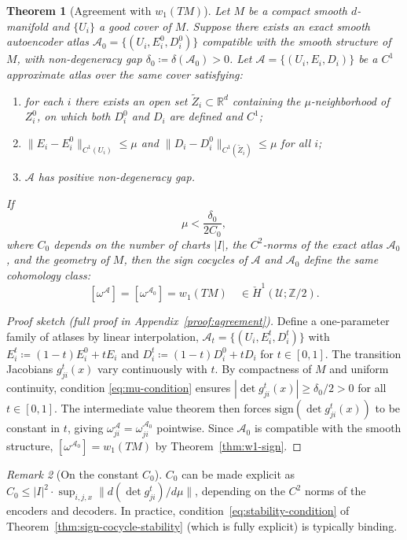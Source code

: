 \documentclass[11pt]{article}
\newcommand{\R}{\mathbb{R}}
\newcommand{\Z}{\mathbb{Z}}
\newcommand{\sign}{\mathrm{sign}}
\theoremstyle{plain}
\newtheorem{theorem}{Theorem}[section]
\theoremstyle{definition}
\theoremstyle{remark}
\newtheorem{remark}[theorem]{Remark}
\begin{document}
\begin{theorem}[Agreement with $w_1(TM)$]\label{thm:w1-agreement}
Let $M$ be a compact smooth $d$-manifold and $\{U_i\}$ a good cover of $M$. Suppose there exists an exact smooth autoencoder atlas $\mathcal{A}_0 = \{(U_i, E_i^0, D_i^0)\}$ compatible with the smooth structure of $M$, with non-degeneracy gap $\delta_0 \coloneqq \delta(\mathcal{A}_0) > 0$. Let $\mathcal{A} = \{(U_i, E_i, D_i)\}$ be a $C^1$ approximate atlas over the same cover satisfying:
\begin{enumerate}[label=(\roman*)]
    \item for each $i$ there exists an open set $\widetilde{Z}_i \subset \R^d$ containing the $\mu$-neighborhood of $Z_i^0$, on which both $D_i^0$ and $D_i$ are defined and $C^1$;
    \item $\|E_i - E_i^0\|_{C^1(U_i)} \leq \mu$ and $\|D_i - D_i^0\|_{C^1(\widetilde{Z}_i)} \leq \mu$ for all $i$;
    \item $\mathcal{A}$ has positive non-degeneracy gap.
\end{enumerate}
If
\begin{equation}\label{eq:mu-condition}
\mu < \frac{\delta_0}{2C_0},
\end{equation}
where $C_0$ depends on the number of charts $|I|$, the $C^2$-norms of the exact atlas $\mathcal{A}_0$, and the geometry of $M$, then the sign cocycles of $\mathcal{A}$ and $\mathcal{A}_0$ define the same cohomology class:
\[
[\omega^{\mathcal{A}}] = [\omega^{\mathcal{A}_0}] = w_1(TM) \quad \in \check{H}^1(\mathcal{U}; \Z/2).
\]
\end{theorem}
\begin{proof}[Proof sketch (full proof in Appendix~\ref{proof:agreement})]
Define a one-parameter family of atlases by linear interpolation, $\mathcal{A}_t = \{(U_i, E_i^t, D_i^t)\}$ with $E_i^t \coloneqq (1-t)E_i^0 + tE_i$ and $D_i^t \coloneqq (1-t)D_i^0 + tD_i$ for $t \in [0,1]$. The transition Jacobians $g_{ji}^t(x)$ vary continuously with $t$. By compactness of $M$ and uniform continuity, condition \eqref{eq:mu-condition} ensures $|\det g_{ji}^t(x)| \geq \delta_0/2 > 0$ for all $t \in [0,1]$. The intermediate value theorem then forces $\sign(\det g_{ji}^t(x))$ to be constant in $t$, giving $\omega_{ji}^{\mathcal{A}} = \omega_{ji}^{\mathcal{A}_0}$ pointwise. Since $\mathcal{A}_0$ is compatible with the smooth structure, $[\omega^{\mathcal{A}_0}] = w_1(TM)$ by Theorem~\ref{thm:w1-sign}.
\end{proof}

\begin{remark}[On the constant $C_0$]\label{rem:C0-constant}
$C_0$ can be made explicit as $C_0 \leq |I|^2 \cdot \sup_{i,j,x} \|d(\det g_{ji}^t)/d\mu\|$, depending on the $C^2$ norms of the encoders and decoders. In practice, condition~\eqref{eq:stability-condition} of Theorem~\ref{thm:sign-cocycle-stability} (which is fully explicit) is typically binding.
\end{remark}
\end{document}
